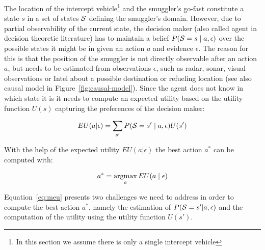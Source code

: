 \documentclass[conference]{IEEEtran}
\begin{document}
The location of the intercept vehicle\footnote{In this section we assume there is only a single intercept vehicle} and the smuggler's go-fast constitute a state $s$ in a set of states $\S$ defining the smuggler's domain. However, due to partial observability of the current state, the decision maker (also called agent in decision theoretic literature) has to maintain a belief $P(\S = s \mid  a, \epsilon)$ over the possible states it might be in given an action $a$ and evidence $\epsilon$. The reason for this is that the position of the smuggler is not directly observable after an action $a$, but needs to be estimated from observations $\epsilon$, such as radar, sonar, visual observations or Intel about a possible destination or refueling location (see also causal model in Figure~\ref{fig:causal-model}). Since the agent does not know in which state it is it needs to compute an expected utility based on the utility function $U(s)$ capturing the preferences of the decision maker:

\begin{eqnarray}
 EU(a|\epsilon) = \sum_{s'}P(\S = s'\mid a, \epsilon)U(s')
\end{eqnarray}

With the help of the expected utility $EU(a|\epsilon)$ the best action $a^*$ can be computed with:

\begin{eqnarray}\label{eq:meu}
 a^* = \argmax_a EU(a\mid \epsilon)
\end{eqnarray}

Equation~\ref{eq:meu} presents two challenges we need to address in order to compute the best action $a^*$, namely the estimation of $P(\S = s'|a, \epsilon)$ and the computation of the utility using the utility function $U(s')$.
\end{document}
